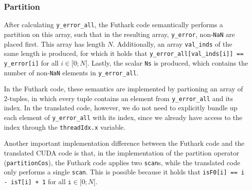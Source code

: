 \subsubsection{Partition}
After calculating \texttt{y\_error\_all}, the Futhark code semantically
performs a partition on this array, such that in the resulting array,
\texttt{y\_error}, non-\texttt{NaN} are placed first.
This array has length \(N\).
Additionally, an array \texttt{val\_inds} of the same length is produced, for
which it holds that \texttt{y\_error\_all[val\_inds[i]] == y\_error[i]} for all
\(i\in [0;N[\).
Lastly, the scalar \texttt{Ns} is produced, which contains the number of
non-\texttt{NaN} elements in \texttt{y\_error\_all}.

In the Futhark code, these semantics are implemented by partioning an array of
2-tuples, in which every tuple contains an element from \texttt{y\_error\_all}
and its index.
In the translated code, however, we do not need to explicitly bundle up each
element of \texttt{y\_error\_all} with its index, since we already have access
to the index through the \texttt{threadIdx.x} variable.

Another important implementation difference between the Futhark code and the
translated CUDA code is that, in the implementation of the partition operator
(\texttt{partitionCos}), the Futhark code applies two \texttt{scan}s, while the
translated code only performs a single \texttt{scan}.
This is possible because it holds that \texttt{isF0[i] == i - isT[i] + 1} for
all \(\mathtt{i}\in [0;N[\).

